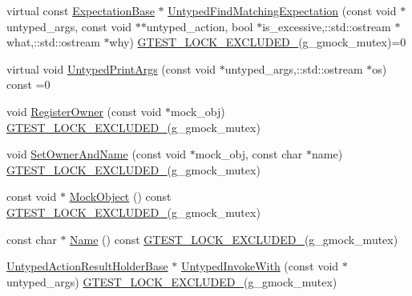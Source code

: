 \begin{DoxyCompactItemize}
\item 
virtual const \hyperlink{classtesting_1_1internal_1_1ExpectationBase}{Expectation\+Base} $\ast$ \hyperlink{classtesting_1_1internal_1_1UntypedFunctionMockerBase_a6461abd05786eee4e125a2695382852d}{Untyped\+Find\+Matching\+Expectation} (const void $\ast$untyped\+\_\+args, const void $\ast$$\ast$untyped\+\_\+action, bool $\ast$is\+\_\+excessive,\+::std\+::ostream $\ast$what,\+::std\+::ostream $\ast$why) \hyperlink{gtest-port_8h_a69abff5a4efdd07bd5faebe3dd318d06}{G\+T\+E\+S\+T\+\_\+\+L\+O\+C\+K\+\_\+\+E\+X\+C\+L\+U\+D\+E\+D\+\_\+}(g\+\_\+gmock\+\_\+mutex)=0
\item 
virtual void \hyperlink{classtesting_1_1internal_1_1UntypedFunctionMockerBase_a3bd7439b411fc00f7d9f9a6f9591ae2c}{Untyped\+Print\+Args} (const void $\ast$untyped\+\_\+args,\+::std\+::ostream $\ast$os) const =0
\item 
void \hyperlink{classtesting_1_1internal_1_1UntypedFunctionMockerBase_a0cd3dd14b92c714eab690c9597f32ffd}{Register\+Owner} (const void $\ast$mock\+\_\+obj) \hyperlink{gtest-port_8h_a69abff5a4efdd07bd5faebe3dd318d06}{G\+T\+E\+S\+T\+\_\+\+L\+O\+C\+K\+\_\+\+E\+X\+C\+L\+U\+D\+E\+D\+\_\+}(g\+\_\+gmock\+\_\+mutex)
\item 
void \hyperlink{classtesting_1_1internal_1_1UntypedFunctionMockerBase_a287bcacee639b7d123cec29e0614fe96}{Set\+Owner\+And\+Name} (const void $\ast$mock\+\_\+obj, const char $\ast$name) \hyperlink{gtest-port_8h_a69abff5a4efdd07bd5faebe3dd318d06}{G\+T\+E\+S\+T\+\_\+\+L\+O\+C\+K\+\_\+\+E\+X\+C\+L\+U\+D\+E\+D\+\_\+}(g\+\_\+gmock\+\_\+mutex)
\item 
const void $\ast$ \hyperlink{classtesting_1_1internal_1_1UntypedFunctionMockerBase_a71863dd67193a7082078d5b366d5ce51}{Mock\+Object} () const \hyperlink{gtest-port_8h_a69abff5a4efdd07bd5faebe3dd318d06}{G\+T\+E\+S\+T\+\_\+\+L\+O\+C\+K\+\_\+\+E\+X\+C\+L\+U\+D\+E\+D\+\_\+}(g\+\_\+gmock\+\_\+mutex)
\item 
const char $\ast$ \hyperlink{classtesting_1_1internal_1_1UntypedFunctionMockerBase_ae90a5b5d48db1e99634bc6ff39ded335}{Name} () const \hyperlink{gtest-port_8h_a69abff5a4efdd07bd5faebe3dd318d06}{G\+T\+E\+S\+T\+\_\+\+L\+O\+C\+K\+\_\+\+E\+X\+C\+L\+U\+D\+E\+D\+\_\+}(g\+\_\+gmock\+\_\+mutex)
\item 
\hyperlink{classtesting_1_1internal_1_1UntypedActionResultHolderBase}{Untyped\+Action\+Result\+Holder\+Base} $\ast$ \hyperlink{classtesting_1_1internal_1_1UntypedFunctionMockerBase_adaec41c0ba8a07c2415f6c8efa0ca54f}{Untyped\+Invoke\+With} (const void $\ast$untyped\+\_\+args) \hyperlink{gtest-port_8h_a69abff5a4efdd07bd5faebe3dd318d06}{G\+T\+E\+S\+T\+\_\+\+L\+O\+C\+K\+\_\+\+E\+X\+C\+L\+U\+D\+E\+D\+\_\+}(g\+\_\+gmock\+\_\+mutex)
\end{DoxyCompactItemize}
